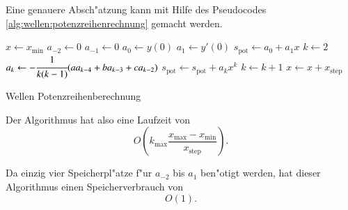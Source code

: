 Eine genauere Absch"atzung kann mit Hilfe des Pseudocodes 
\ref{alg:wellen:potenzreihenrechnung} gemacht werden.

\begin{algorithm}
	\begin{algorithmic}[1]
		\State $x \gets x_{\text{min}}$
			\State $a_{-2} \gets 0$
			\State $a_{-1} \gets 0$
			\State $a_0 \gets y(0)$
			\State $a_1 \gets y'(0)$
			\State $s_{\text{pot}} \gets a_0 + a_1x$
			\State $k \gets 2$
				\State $a_k \gets -\cfrac{1}{k(k-1)}			
				(aa_{k-4}+ba_{k-3}+ca_{k-2})$
				\State $s_{\text{pot}} \gets s_{\text{pot}} + a_k x^k$
				\State $k \gets k + 1$
			\EndFor
			\State $x \gets x + x_{\text{step}}$
		\EndFor
	\end{algorithmic}
	\caption{Wellen Potenzreihenberechnung} 
	\label{alg:wellen:potenzreihenrechnung}
\end{algorithm}

Der Algorithmus hat also eine Laufzeit von
\begin{equation*}
	O
	\left(
		k_{\text{max}}\frac{x_{\text{max}}-x_{\text{min}}}{x_{\text{step}}}
	\right).
\end{equation*}

Da einzig vier Speicherpl"atze f"ur $a_{-2}$ bis $a_1$ ben"otigt werden, hat 
dieser Algorithmus einen Speicherverbrauch von
\begin{equation*}
	O
	\left(
		1
	\right).
\end{equation*}